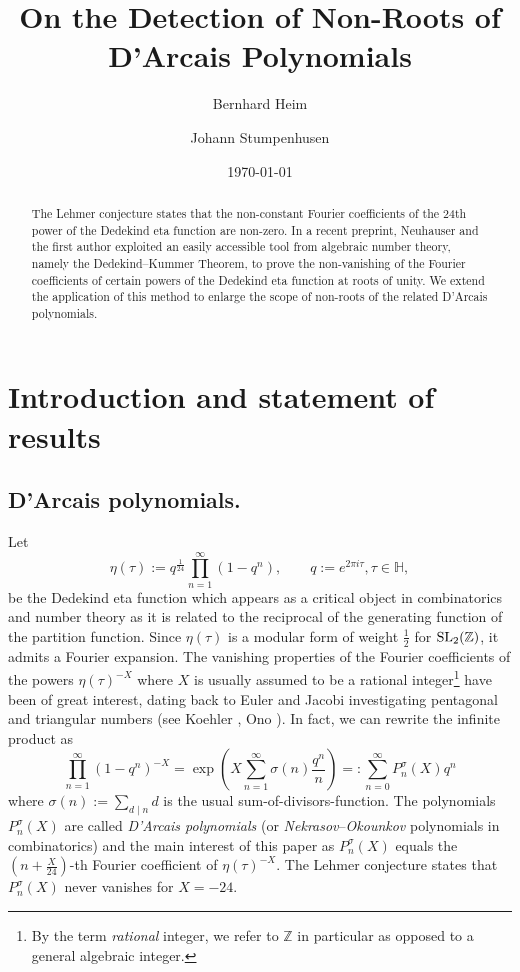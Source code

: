 \documentclass[a4paper, 11pt, reqno]{amsart}
\title{On the Detection of Non-Roots of D'Arcais Polynomials}
\author{Bernhard Heim}
\author{Johann Stumpenhusen}
\date{\today}
\theoremstyle{plain}
\theoremstyle{definition}
\theoremstyle{remark}
\numberwithin{equation}{section}
\renewcommand{\H}{\mathbb{H}}
\newcommand{\Z}{\mathbb{Z}}
\newcommand{\slz}{{\text {\rm SL}}_2(\mathbb{Z})}
\begin{document}
\maketitle


\begin{abstract}
    The Lehmer conjecture states that the non-constant Fourier coefficients of the 24th power of the Dedekind eta function are non-zero. In a recent preprint, Neuhauser and the first author exploited an easily accessible tool from algebraic number theory, namely the Dedekind--Kummer Theorem, to prove the non-vanishing of the Fourier coefficients of certain powers of the Dedekind eta function at roots of unity. We extend the application of this method to enlarge the scope of non-roots of the related D'Arcais polynomials.
\end{abstract}

\section{Introduction and statement of results}

\subsection{D'Arcais polynomials.} Let
\[\eta(\tau) := q^{\frac{1}{24}}\prod_{n = 1}^\infty (1 - q^n), \qquad q := e^{2\pi i \tau}, \tau \in \H,\]
be the Dedekind eta function which appears as a critical object in combinatorics and number theory as it is related to the reciprocal of the generating function of the partition function. Since $\eta(\tau)$ is a modular form of weight $\frac{1}{2}$ for $\slz$, it admits a Fourier expansion. The vanishing properties of the Fourier coefficients of the powers $\eta(\tau)^{-X}$ where $X$ is usually assumed to be a rational integer\footnote{By the term \textit{rational} integer, we refer to $\Z$ in particular as opposed to a general algebraic integer.} have been of great interest, dating back to Euler and Jacobi investigating pentagonal and triangular numbers  (see Koehler \cite{Koehler}, Ono \cite{On03}). In fact, we can rewrite the infinite product as
\begin{equation*}\label{eq:DefD'ArcaisPolynomials}
    \prod_{n = 1}^\infty (1 - q^n)^{-X} = \exp \left(X \sum_{n = 1}^\infty \sigma(n) \frac{q^n}{n}\right) =: \sum_{n = 0}^\infty P_n^\sigma(X)q^n
\end{equation*}
where $\sigma(n) := \sum_{d \mid n} d$ is the usual sum-of-divisors-function. The polynomials $P_n^\sigma(X)$ are called \textit{D'Arcais polynomials} (or \textit{Nekrasov}--\textit{Okounkov} polynomials in combinatorics) and the main interest of this paper as $P_n^\sigma(X)$ equals the $(n+\frac{X}{24})$-th Fourier coefficient of $\eta(\tau)^{-X}$. The Lehmer conjecture \cite{Lehmer} states that $P_n^\sigma(X)$ never vanishes for $X = -24$.
\end{document}
